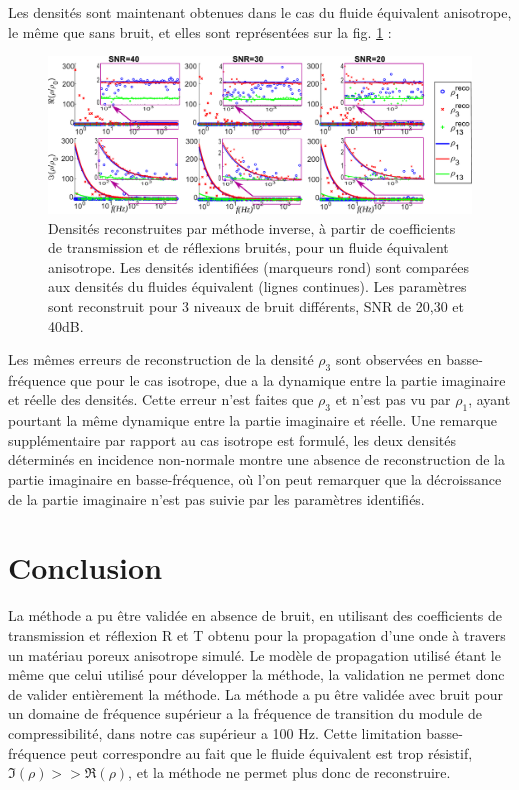 \documentclass[twoside,openright]{report}
\begin{document}
    Les densités sont maintenant obtenues dans le cas du fluide équivalent anisotrope, le même que sans bruit, et elles sont représentées sur la fig. \ref{rho_anis_noise} : 
    
    \begin{figure}[ht!]
        \centering
        \includegraphics[scale=0.4]{Density_anis_noisy.pdf}
        \caption{Densités reconstruites par méthode inverse, à partir de coefficients de transmission et de réflexions bruités, pour un fluide équivalent anisotrope. Les densités identifiées (marqueurs rond) sont comparées aux densités du fluides équivalent (lignes continues). Les paramètres sont reconstruit pour 3 niveaux de bruit différents, SNR de 20,30 et 40dB.} 
        \label{rho_anis_noise}
    \end{figure}

    Les mêmes erreurs de reconstruction de la densité $\rho_3$ sont observées en basse-fréquence que pour le cas isotrope, due a la dynamique entre la partie imaginaire et réelle des densités. Cette erreur n'est faites que $\rho_3$ et n'est pas vu par $\rho_1$, ayant pourtant la même dynamique entre la partie imaginaire et réelle. Une remarque supplémentaire  par rapport au cas isotrope est formulé, les deux densités déterminés en incidence non-normale montre une absence de reconstruction de la partie imaginaire en basse-fréquence, où l'on peut remarquer que la décroissance de la partie imaginaire n'est pas suivie par les paramètres identifiés.
    
\section{Conclusion}
    La méthode a pu être validée en absence de bruit, en utilisant des coefficients de transmission et réflexion R et T obtenu pour la propagation d'une onde à travers un matériau poreux anisotrope simulé. Le modèle de propagation utilisé étant le même que celui utilisé pour développer la méthode, la validation ne permet donc de valider entièrement la méthode.
    La méthode a pu être validée avec bruit pour un domaine de fréquence supérieur a la fréquence de transition du module de compressibilité, dans notre cas supérieur a 100 Hz. Cette limitation basse-fréquence peut correspondre au fait que le fluide équivalent est trop résistif, $\Im(\rho)>>\Re(\rho)$, et la méthode ne permet plus donc de reconstruire.
    
\end{document}
